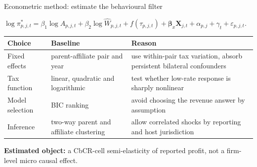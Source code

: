 \documentclass[aspectratio=169, 11pt]{beamer}
\newcommand{\emphbx}[1]{\textcolor{Bordeaux}{\textbf{#1}}}
\begin{document}
\begin{frame}{Econometric method: estimate the behavioural filter}
\begin{center}
\footnotesize
$\log \pi_{p,j,t}^{*}
=
\beta_1\log A_{p,j,t}
+\beta_2\log \hat{W}_{p,j,t}
+f(\tau_{p,j,t})
+\boldsymbol{\beta}_x\mathbf{X}_{j,t}
+\alpha_{p,j}
+\gamma_t
+\varepsilon_{p,j,t}.$
\end{center}

\vspace{-0.05em}
\begin{center}
\scriptsize
\begin{tabular}{@{}L{3.2cm}L{4.2cm}L{4.0cm}@{}}
  \toprule
  \textbf{Choice} & \textbf{Baseline} & \textbf{Reason} \\
  \midrule
  Fixed effects & parent-affiliate pair and year & use within-pair tax variation, absorb persistent bilateral confounders \\
  Tax function & linear, quadratic and logarithmic & test whether low-rate response is sharply nonlinear \\
  Model selection & BIC ranking & avoid choosing the revenue answer by assumption \\
  Inference & two-way parent and affiliate clustering & allow correlated shocks by reporting and host jurisdiction \\
  \bottomrule
\end{tabular}
\end{center}

\vspace{0.05em}
\scriptsize
\emphbx{Estimated object:} a CbCR-cell semi-elasticity of reported profit, not a firm-level micro causal effect.
\end{frame}
\end{document}
